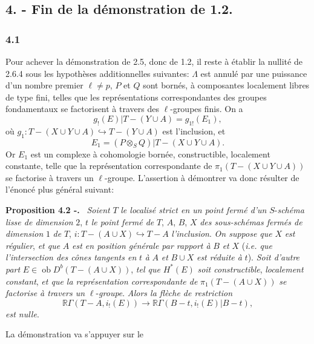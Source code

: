 \documentclass[11pt]{article}
\newenvironment{statement}[1]{\par\medskip\noindent\textbf{#1.}\ }{\par\medskip}
\newcommand{\R}{\mathbb{R}}\newcommand{\RHomCore}{\mathbb{R}\mathrm{Hom}}
\providecommand{\Ob}{\operatorname{ob}}
\providecommand{\Ob}{\operatorname{ob}}
\providecommand{\R}{\mathrm R}
\providecommand{\Ob}{\operatorname{Ob}}
\providecommand{\Ob}{\operatorname{ob}}
\providecommand{\Ob}{\operatorname{Ob}}
\begin{document}
\subsection*{4. - Fin de la démonstration de 1.2.}

\subsubsection*{4.1}
Pour achever la démonstration de 2.5, donc de 1.2, il reste à établir la nullité de 2.6.4 sous les hypothèses additionnelles suivantes: $\Lambda$ est annulé par une puissance d'un nombre premier $\ell\ne p$, $P$ et $Q$ sont bornés, à composantes localement libres de type fini, telles que les représentations correspondantes des groupes fondamentaux se factorisent à travers des $\ell$-groupes finis. On a
\[
g_!(E)|T-(Y\cup A)=g_{1!}(E_1),
\]
où $g_1:T-(X\cup Y\cup A)\hookrightarrow T-(Y\cup A)$ est l'inclusion, et
\[
E_1=(P\otimes_S Q)|T-(X\cup Y\cup A).
\]
Or $E_1$ est un complexe à cohomologie bornée, constructible, localement constante, telle que la représentation correspondante de $\pi_1(T-(X\cup Y\cup A))$ se factorise à travers un $\ell$-groupe. L'assertion à démontrer va donc résulter de l'énoncé plus général suivant:

\begin{statement}{Proposition 4.2 -}
\emph{Soient} $T$ \emph{le localisé strict en un point fermé d'un} $S$-\emph{schéma lisse de dimension} $2$, $t$ \emph{le point fermé de} $T$, $A$, $B$, $X$ \emph{des sous-schémas fermés de dimension} $1$ \emph{de} $T$, $i:T-(A\cup X)\hookrightarrow T-A$ \emph{l'inclusion}. \emph{On suppose que} $X$ \emph{est régulier}, \emph{et que} $A$ \emph{est en position générale par rapport à} $B$ \emph{et} $X$ (\emph{i.e. que l'intersection des cônes tangents en} $t$ \emph{à} $A$ \emph{et} $B\cup X$ \emph{est réduite à} $t$). \emph{Soit d'autre part} $E\in\Ob D^b(T-(A\cup X))$, \emph{tel que} $H^*(E)$ \emph{soit constructible}, \emph{localement constant}, \emph{et que la représentation correspondante de} $\pi_1(T-(A\cup X))$ \emph{se factorise à travers un} $\ell$-\emph{groupe}. \emph{Alors la flèche de restriction}
\[
\R\Gamma(T-A,i_!(E))
\longrightarrow
\R\Gamma(B-t,i_!(E)|B-t),
\]
\emph{est nulle}.
\end{statement}

La démonstration va s'appuyer sur le
\end{document}
